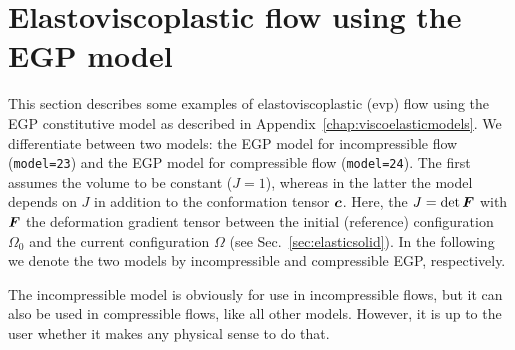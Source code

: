 
\def\headdate{15th December 2025}

\section{Elastoviscoplastic flow using the EGP model}
\label{sec:egp_flow}

This section describes some examples of elastoviscoplastic (evp) flow using
the EGP constitutive model as described in
Appendix~\ref{chap:viscoelasticmodels}. We differentiate between two models: the EGP model for incompressible flow (\texttt{model=23}) and the EGP model for compressible flow (\texttt{model=24}). The first assumes the volume to be constant ($J=1$), whereas in the latter the model depends on $J$ in addition to the conformation tensor $\boldsymbol{c}$.
Here, the $J=\det\boldsymbol{F}$ with $\boldsymbol{F}$ the deformation gradient tensor
between the initial (reference) configuration
$\Omega_0$ and the current configuration $\Omega$ (see
Sec.~\ref{sec:elasticsolid}).
In the following we denote the two models by incompressible and compressible EGP, respectively.

The incompressible model is obviously for use in incompressible flows, but it can also be used in compressible flows, like all other models. However, it is up to the user whether it makes any physical sense to do that.

